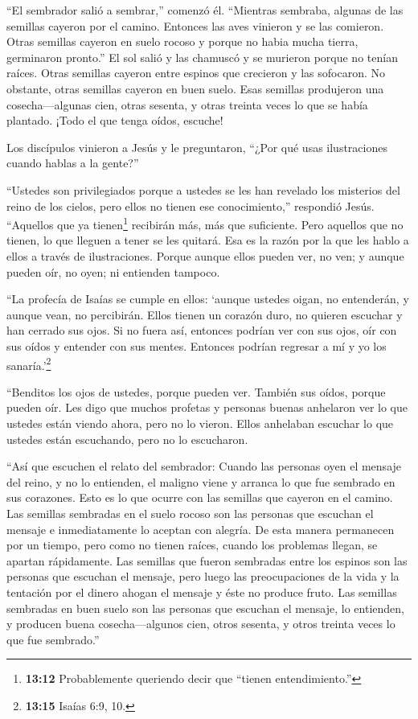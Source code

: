 ``El sembrador salió a sembrar,'' comenzó él.  ``Mientras
sembraba, algunas de las semillas cayeron por el camino. Entonces las
aves vinieron y se las comieron.  Otras semillas cayeron en
suelo rocoso y porque no habia mucha tierra, germinaron pronto.''
 El sol salió y las chamuscó y se murieron porque no tenían
raíces.  Otras semillas cayeron entre espinos que crecieron
y las sofocaron.  No obstante, otras semillas cayeron en
buen suelo. Esas semillas produjeron una cosecha---algunas cien, otras
sesenta, y otras treinta veces lo que se había plantado. 
¡Todo el que tenga oídos, escuche!

 Los discípulos vinieron a Jesús y le preguntaron, ``¿Por
qué usas ilustraciones cuando hablas a la gente?''

 ``Ustedes son privilegiados porque a ustedes se les han
revelado los misterios del reino de los cielos, pero ellos no tienen ese
conocimiento,'' respondió Jesús.  ``Aquellos que ya
tienen\footnote{\textbf{13:12} Probablemente queriendo decir que
  ``tienen entendimiento.''} recibirán más, más que suficiente. Pero
aquellos que no tienen, lo que lleguen a tener se les quitará.
 Esa es la razón por la que les hablo a ellos a través de
ilustraciones. Porque aunque ellos pueden ver, no ven; y aunque pueden
oír, no oyen; ni entienden tampoco.

 ``La profecía de Isaías se cumple en ellos: `aunque
ustedes oigan, no entenderán, y aunque vean, no percibirán.
 Ellos tienen un corazón duro, no quieren escuchar y han
cerrado sus ojos. Si no fuera así, entonces podrían ver con sus ojos,
oír con sus oídos y entender con sus mentes. Entonces podrían regresar a
mí y yo los sanaría.'\footnote{\textbf{13:15} Isaías 6:9, 10.}

 ``Benditos los ojos de ustedes, porque pueden ver. También
sus oídos, porque pueden oír.  Les digo que muchos profetas
y personas buenas anhelaron ver lo que ustedes están viendo ahora, pero
no lo vieron. Ellos anhelaban escuchar lo que ustedes están escuchando,
pero no lo escucharon.

 ``Así que escuchen el relato del sembrador: 
Cuando las personas oyen el mensaje del reino, y no lo entienden, el
maligno viene y arranca lo que fue sembrado en sus corazones. Esto es lo
que ocurre con las semillas que cayeron en el camino.  Las
semillas sembradas en el suelo rocoso son las personas que escuchan el
mensaje e inmediatamente lo aceptan con alegría.  De esta
manera permanecen por un tiempo, pero como no tienen raíces, cuando los
problemas llegan, se apartan rápidamente.  Las semillas que
fueron sembradas entre los espinos son las personas que escuchan el
mensaje, pero luego las preocupaciones de la vida y la tentación por el
dinero ahogan el mensaje y éste no produce fruto.  Las
semillas sembradas en buen suelo son las personas que escuchan el
mensaje, lo entienden, y producen buena cosecha---algunos cien, otros
sesenta, y otros treinta veces lo que fue sembrado.''

